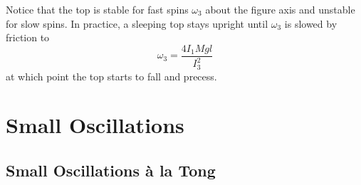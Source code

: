 \documentclass[11pt, a4paper]{article}
\begin{document}
\begin{itemize}
\begin{itemize}
	\end{itemize}
	Notice that the top is stable for fast spins $ \omega_{3} $ about the figure axis and unstable for slow spins. In practice, a sleeping top stays upright until $ \omega_{3} $ is slowed by friction to
	\begin{equation*}
		\omega_{3} = \frac{4I_{1}Mgl}{I_{3}^{2}} 
	\end{equation*}
	at which point the top starts to fall and precess.
	
	
\end{itemize}




\section{Small Oscillations}

\subsection{Small Oscillations \`{a} la Tong}
\end{document}
